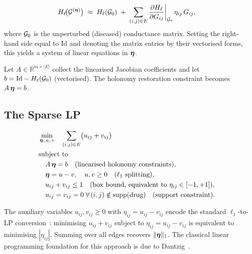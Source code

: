 \begin{equation}
  H_\ell\!\bigl(\mathcal{G}^{(\boldsymbol{\eta})}\bigr)
  \;\approx\;
  H_\ell(\mathcal{G}_0)
  \;+\;
  \sum_{(i,j)\in E}
    \frac{\partial H_\ell}{\partial G_{ij}}\biggr|_{\mathcal{G}_0}
    \,\eta_{ij}\,G_{ij},
  \label{eq:holonomy-linearise}
\end{equation}
where $\mathcal{G}_0$ is the unperturbed (diseased) conductance matrix.
Setting the right-hand side equal to $\mathrm{Id}$ and denoting the matrix
entries by their vectorised forms, this yields a system of linear equations
in $\boldsymbol{\eta}$.

Let $A \in \mathbb{R}^{m \times |E|}$ collect the linearised Jacobian
coefficients and let $b = \mathrm{Id} - H_\ell(\mathcal{G}_0)$ (vectorised).  The
holonomy restoration constraint becomes $A\,\boldsymbol{\eta} = b$.

\subsection{The Sparse LP}

\begin{tcolorbox}[
  colback=blue!4!white, colframe=blue!55!black,
  title={\bfseries Unified Therapeutic Equation (Sparse LP)},
  fonttitle=\small\bfseries]
\begin{equation}
  \begin{aligned}
    &\min_{\boldsymbol{\eta},\, u,\, v} \quad \sum_{(i,j)\in E} \bigl(u_{ij} + v_{ij}\bigr)\\
    &\text{subject to}\\
    &\quad A\,\boldsymbol{\eta} = b
         \quad\text{(linearised holonomy constraints)},\\
    &\quad \boldsymbol{\eta} = u - v,\quad u,v \geq 0
         \quad\text{($\ell_1$ splitting)},\\
    &\quad u_{ij} + v_{ij} \leq 1
         \quad\text{(box bound, equivalent to $\eta_{ij}\in[-1,+1]$)},\\
    &\quad u_{ij} = v_{ij} = 0 \;\forall\,(i,j)\notin\mathrm{supp}(\text{drug})
         \quad\text{(support constraint)}.
  \end{aligned}
  \label{eq:sparse-LP}
\end{equation}
\end{tcolorbox}

The auxiliary variables $u_{ij}, v_{ij} \geq 0$ with $\eta_{ij} = u_{ij} - v_{ij}$
encode the standard $\ell_1$-to-LP conversion~\citep{Tibshirani1996,Candes2006}: minimising $u_{ij} + v_{ij}$
subject to $\eta_{ij} = u_{ij} - v_{ij}$ is equivalent to minimising
$|\eta_{ij}|$.  Summing over all edges recovers $\|\boldsymbol{\eta}\|_1$.  The
classical linear programming foundation for this approach is due to
Dantzig~\citep{Dantzig1963}.

